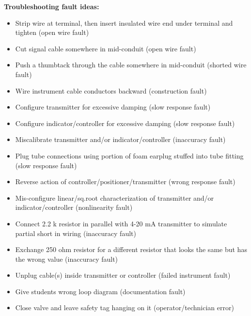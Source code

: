\noindent
{\bf Troubleshooting fault ideas:}

\begin{itemize}
\goodbreak
\item{} Strip wire at terminal, then insert insulated wire end under terminal and tighten (open wire fault)
\item{} Cut signal cable somewhere in mid-conduit (open wire fault)
\item{} Push a thumbtack through the cable somewhere in mid-conduit (shorted wire fault)
\item{} Wire instrument cable conductors backward (construction fault)
\item{} Configure transmitter for excessive damping (slow response fault)
\item{} Configure indicator/controller for excessive damping (slow response fault)
\item{} Miscalibrate transmitter and/or indicator/controller (inaccuracy fault)
\item{} Plug tube connections using portion of foam earplug stuffed into tube fitting (slow response fault)
\item{} Reverse action of controller/positioner/transmitter (wrong response fault)
\item{} Mis-configure linear/sq.root characterization of transmitter and/or indicator/controller (nonlinearity fault)
\item{} Connect 2.2 k resistor in parallel with 4-20 mA transmitter to simulate partial short in wiring (inaccuracy fault)
\item{} Exchange 250 ohm resistor for a different resistor that looks the same but has the wrong value (inaccuracy fault) 
\item{} Unplug cable(s) inside transmitter or controller (failed instrument fault)
\item{} Give students wrong loop diagram (documentation fault)
\item{} Close valve and leave safety tag hanging on it (operator/technician error)
\end{itemize}




















\vfil \eject

